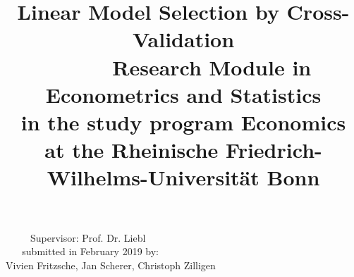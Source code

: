 \documentclass[Research_Module_ES.tex]{subfiles}
\begin{document}
\title{\LARGE{\textbf{Linear Model Selection by  Cross-Validation}}\\
	~
	\newline\newline\newline
	~										
	\newline\newline\newline
	~
	\doublespacing
	\normalsize	
	Research Module in Econometrics and Statistics\\
	in the study program Economics\\
	at the Rheinische Friedrich-Wilhelms-Universität Bonn}

\onehalfspacing			
\author{}
\date{}
\maketitle	
\begin{center}
	\normalsize 
	~										
	\newline\newline\newline
	~										
	\newline\newline\newline
	~
	Supervisor: Prof. Dr. Liebl\\
	~
	\newline\newline\newline
	~	
	submitted in February 2019 by:\\ 
	Vivien Fritzsche, Jan Scherer, Christoph Zilligen 
\end{center}	
	
\end{document}
